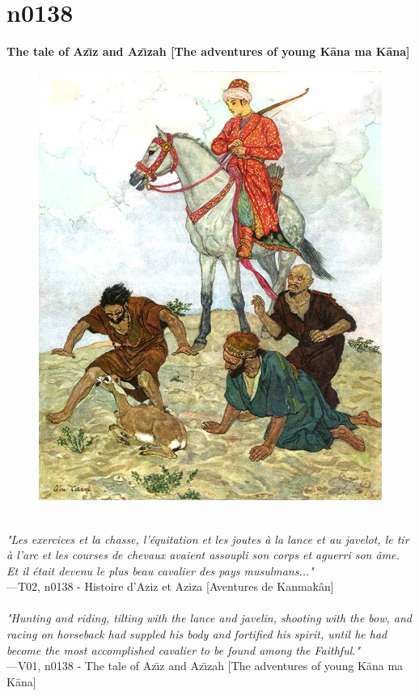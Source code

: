 \documentclass[../Carre_nights.tex]{subfiles}
\begin{document}
\newpage

\section{n0138}
\textbf{\Large{The tale of Az\={\i}z and Az\={\i}zah [The adventures of young K\=ana ma K\=ana]}} \\

\begin{figure}[ht]
\centering
\includegraphics[height=\figsize]{illustrations/volume_2/T02, n0138 - Histoire d’Aziz et Aziza [Aventures de Kanmakân].jpg}
\end{figure}

\textit{\\
"Les exercices et la chasse, l’équitation et les joutes à la lance et au javelot, le tir à l’arc et les courses de chevaux avaient assoupli son corps et aguerri son âme. Et il était devenu le plus beau cavalier des pays musulmans..."} \\
—T02, n0138 - Histoire d’Aziz et Aziza [Aventures de Kanmakân] \\~\\
\textit{"Hunting and riding, tilting with the lance and javelin, shooting with the bow, and racing on horseback had suppled his body and fortified his spirit, until he had become the most accomplished cavalier to be found among the Faithful."} \\
—V01, n0138 - The tale of Az\={\i}z and Az\={\i}zah [The adventures of young K\=ana ma K\=ana]
\end{document}
